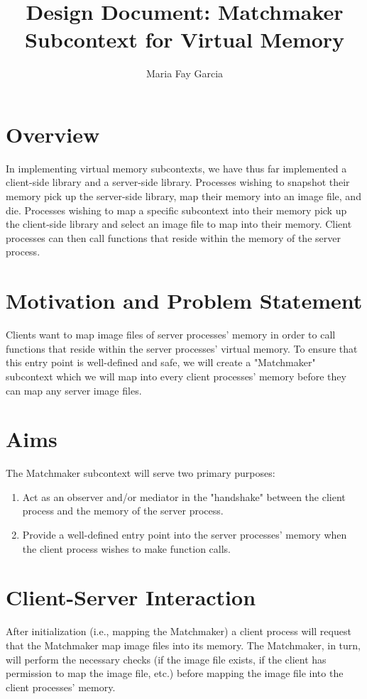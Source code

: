 \documentclass{article}
\title{Design Document: Matchmaker Subcontext for Virtual Memory}
\author{Maria Fay Garcia}
\date{}
\begin{document}
\maketitle


\section{Overview}
In implementing virtual memory subcontexts, we have thus far implemented a
client-side library and a server-side library. Processes wishing to snapshot
their memory pick up the server-side library, map their memory into an image
file, and die. Processes wishing to map a specific subcontext into their memory
pick up the client-side library and select an image file to map into their
memory. Client processes can then call functions that reside within the memory
of the server process.

\section{Motivation and Problem Statement}
Clients want to map image files of server processes' memory in order to call
functions that reside within the server processes' virtual memory. To ensure
that this entry point is well-defined and safe, we will create a "Matchmaker"
subcontext which we will map into every client processes' memory before they
can map any server image files.

\section{Aims}
The Matchmaker subcontext will serve two primary purposes:
\begin{enumerate}[(1)]
    \item Act as an observer and/or mediator in the "handshake" between the client
    process and the memory of the server process.
    \item Provide a well-defined entry point into the server processes' memory when
    the client process wishes to make function calls.
\end{enumerate}

\section{Client-Server Interaction}
After initialization (i.e., mapping the Matchmaker) a client process will
request that the Matchmaker map image files into its memory. The Matchmaker, in
turn, will perform the necessary checks (if the image file exists, if the
client has permission to map the image file, etc.) before mapping the image
file into the client processes' memory.
\end{document}
